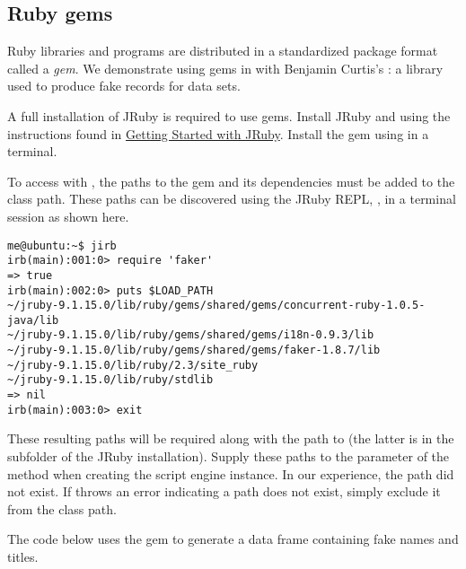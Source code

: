 \subsection{Ruby gems}

Ruby libraries and programs are distributed in a standardized package format called a \textit{gem}. We demonstrate using gems in  with Benjamin Curtis's \href{https://github.com/stympy/faker}{}: a library used to produce fake records for data sets. %

A full installation of JRuby is required to use gems. Install JRuby and using the instructions found in \href{https://github.com/jruby/jruby/wiki/GettingStarted}{Getting Started with JRuby}. %
Install the  gem using  in a terminal.

To access  with , the paths to the gem and its dependencies must be added to the  class path. These paths can be discovered using the JRuby REPL, , in a terminal session as shown here.

\begin{verbatim}
me@ubuntu:~$ jirb
irb(main):001:0> require 'faker'
=> true
irb(main):002:0> puts $LOAD_PATH
~/jruby-9.1.15.0/lib/ruby/gems/shared/gems/concurrent-ruby-1.0.5-java/lib
~/jruby-9.1.15.0/lib/ruby/gems/shared/gems/i18n-0.9.3/lib
~/jruby-9.1.15.0/lib/ruby/gems/shared/gems/faker-1.8.7/lib
~/jruby-9.1.15.0/lib/ruby/2.3/site_ruby
~/jruby-9.1.15.0/lib/ruby/stdlib
=> nil
irb(main):003:0> exit
\end{verbatim}

These resulting paths will be required along with the path to  (the latter is in the  subfolder of the JRuby installation). Supply these paths to the  parameter of the   method when creating the script engine instance. In our experience, the  path did not exist. If  throws an error indicating a path does not exist, simply exclude it from the class path.

The code below uses the  gem to generate a data frame containing fake names and titles.


